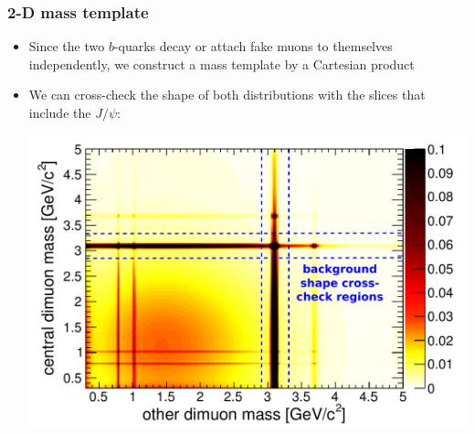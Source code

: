 \documentclass[compress]{beamer}
\begin{document}
\begin{frame}
\frametitle{2-D mass template}

\begin{itemize}
\item Since the two $b$-quarks decay or attach fake muons to
  themselves independently, we construct a mass template by a
  Cartesian product
\item We can cross-check the shape of both distributions with the
  slices that include the $J/\psi$:
\begin{center}
\includegraphics[width=0.9\linewidth]{background_2d_mass_template.pdf}
\end{center}
\end{itemize}
\end{frame}
\end{document}

